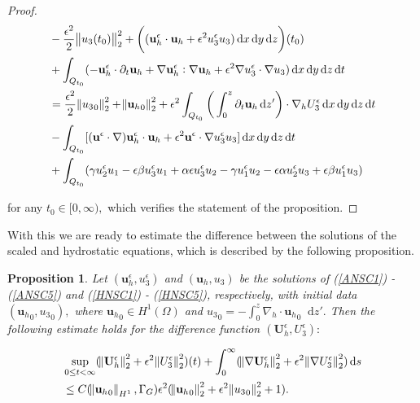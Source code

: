 \documentclass[11pt]{article}
\newtheorem{prop}{Proposition}
\newcommand*\diff{\mathop{}\!\mathrm{d}}
\begin{document}
\begin{proof}
\begin{equation}
  \begin{split}
    & - \frac{\epsilon^2}{2} \norm{u_3(t_0)}_2^2 + \bigg ( (\mathbf{u}_h^\epsilon \cdot \mathbf{u}_h + \epsilon^2 u_3^\epsilon u_3) \diff x \diff y \diff z  \bigg ) (t_0) \\
    & + \int_{Q_{t_0}} (-\mathbf{u}_h^\epsilon \cdot \partial_t \mathbf{u}_h + \nabla \mathbf{u}_h^\epsilon : \nabla \mathbf{u}_h + \epsilon^2 \nabla u_3^\epsilon \cdot \nabla u_3) \diff x \diff y \diff z \diff t \\
    & = \frac{\epsilon^2}{2} \norm{{u_3}_0}_2^2 + \norm{{\mathbf{u}_h}_0}_2^2 + \epsilon^2 \int_{Q_{t_0}} \bigg ( \int_0^z \partial_t \mathbf{u}_h \diff z' \bigg ) \cdot \nabla_h U_3^\epsilon \diff x \diff y \diff z \diff t \\
    & - \int_{Q_{t_0}} [(\mathbf{u}^\epsilon \cdot \nabla) \mathbf{u}_h^\epsilon \cdot \mathbf{u}_h + \epsilon^2 \mathbf{u}^\epsilon \cdot \nabla u_3^\epsilon u_3] \diff x \diff y \diff z \diff t \\
    & + \int_{Q_{t_0}}  ( \gamma u_2^\epsilon u_1 - \epsilon \beta u_3^\epsilon u_1 + \alpha \epsilon u_3^\epsilon u_2 - \gamma u_1^\epsilon u_2 - \epsilon \alpha u_2^\epsilon u_3 + \epsilon \beta u_1^\epsilon u_3)
  \end{split}
\end{equation}

for any $t_0 \in [0, \infty),$ which verifies the statement of the proposition.

\end{proof}

With this we are ready to estimate the difference between the solutions of the scaled and hydrostatic equations, which is described by the following proposition.

\begin{prop}

Let $(\mathbf{u}_h^\epsilon, u_3^\epsilon)$ and $(\mathbf{u}_h,u_3)$ be the solutions of (\ref{ANSC1}) - (\ref{ANSC5}) and (\ref{HNSC1}) - (\ref{HNSC5}), respectively, with initial data $({\mathbf{u}_h}_0, {u_3}_0),$ where ${\mathbf{u}_h}_0 \in H^1(\Omega)$ and ${u_3}_0 = - \int_0^z \nabla_h \cdot {\mathbf{u}_h}_0 \diff z'.$ Then the following estimate holds for the difference function $(\mathbf{U}_h^\epsilon, U_3^\epsilon):$

\begin{equation}
  \begin{split}
    & \sup_{0 \leq t < \infty} ( \norm{\mathbf{U}_h^\epsilon}_2^2 + \epsilon^2 \norm{U_3^\epsilon}_2^2)(t) + \int_0 ^ \infty ( \norm{\nabla \mathbf{U}_h^\epsilon}_2^2 + \epsilon^2 \norm{\nabla U_3^\epsilon}_2^2)\diff s \\
    & \leq C(\norm{{\mathbf{u}_h}_0}_{H^1}, \Gamma_G) \epsilon^2 (\norm{{\mathbf{u}_h}_0}_2^2 + \epsilon^2 \norm{{u_3}_0}_2^2 + 1).
  \end{split}
\end{equation}

\end{prop}
\end{document}
